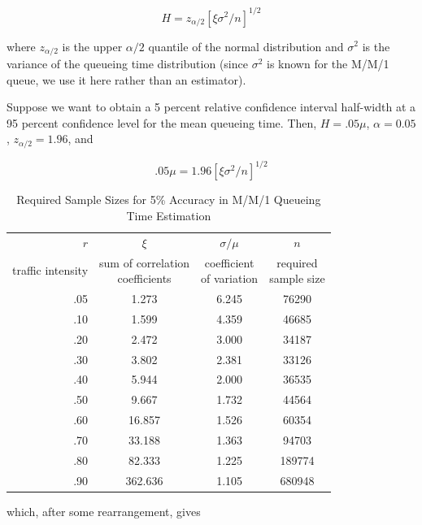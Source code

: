 \begin{equation}
H = z_{\alpha/2} \left[\xi \sigma^2 / n \right]^{1/2}
\label{eq:output-ci-halfwidth-normal}
\end{equation}

where $z_{\alpha/2}$ is the upper $\alpha/2$ quantile of the normal
distribution and $\sigma^2$ is the variance of the queueing time distribution
(since $\sigma^2$ is known for the M/M/1 queue, we use it here rather than an
estimator).

Suppose we want to obtain a 5 percent relative confidence interval half-width
at a 95 percent confidence level for the mean queueing time. Then,
$H = .05\mu$, $\alpha = 0.05$, $z_{\alpha/2} = 1.96$, and

\begin{equation}
.05\mu = 1.96 \left[\xi \sigma^2 / n \right]^{1/2}
\label{eq:output-ci-relative}
\end{equation}

\begin{table}[H]
\centering
\begin{tabular}{rccc}
\toprule
$r$ & $\xi$ & $\sigma/\mu$ & $n$ \\
traffic intensity & \shortstack{sum of correlation\\ coefficients} & \shortstack{coefficient\\ of variation} & \shortstack{required\\ sample size} \\
\midrule
.05 & 1.273 & 6.245 &  76290 \\
.10 & 1.599 & 4.359 &  46685 \\
.20 & 2.472 & 3.000 &  34187 \\
.30 & 3.802 & 2.381 &  33126 \\
.40 & 5.944 & 2.000 &  36535 \\
.50 & 9.667 & 1.732 &  44564 \\
.60 & 16.857 & 1.526 & 60354 \\
.70 & 33.188 & 1.363 & 94703 \\
.80 & 82.333 & 1.225 & 189774 \\
.90 & 362.636 & 1.105 & 680948 \\
\bottomrule
\end{tabular}
\caption{Required Sample Sizes for 5\% Accuracy in M/M/1 Queueing Time Estimation}
\end{table}

\noindent which, after some rearrangement, gives

